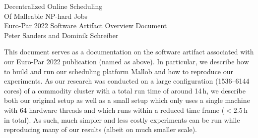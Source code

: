 \documentclass[runningheads]{article}
\numberwithin{dummy}{subsection}
\begin{document}
\begin{center}
\huge Decentralized Online Scheduling\\Of Malleable NP-hard Jobs\\[0.4cm]
\Large Euro-Par 2022 Software Artifact Overview Document\\[0.4cm]
\large Peter Sanders and Dominik Schreiber
\end{center}


%
%
%
%
%
%
%
%

\newenvironment{ttfenv}{\par\vspace{0.2cm}\ttfamily}{\par\vspace{0.2cm}}
\newenvironment{ttfenvcompact}{\par\ttfamily}{\par}

\vspace{0.3cm}

This document serves as a documentation on the software artifact associated with our Euro-Par 2022 publication (named as above).
In particular, we describe how to build and run our scheduling platform Mallob and how to reproduce our experiments.
As our research was conducted on a large configuration (1536--6144 cores) of a commodity cluster with a total run time of around 14\,h, we describe both our original setup as well as a small setup which only uses a single machine with 64 hardware threads and which runs within a reduced time frame ($<2.5$\,h in total).
As such, much simpler and less costly experiments can be run while reproducing many of our results (albeit on much smaller scale).
\end{document}
